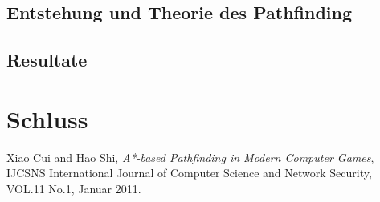\documentclass[12pt,a4paper,german]{article}
\begin{document}
\subsection{Entstehung und Theorie des Pathfinding}

\subsection{Resultate}
\section{Schluss}
\clearpage

\begin{thebibliography}{9}
  Xiao Cui and Hao Shi,
  \textit{A*-based Pathfinding in Modern Computer Games},
  IJCSNS International Journal of Computer Science and Network Security, VOL.11 No.1,
  Januar 2011.
\end{thebibliography}
\end{document}
